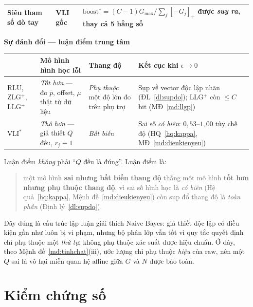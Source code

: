 \documentclass[11pt]{article}
\theoremstyle{remark}
\newcommand{\pos}[1]{\left[#1\right]_+}
\begin{document}
\begin{landscape}
\begin{tabular}{@{}p{4.6cm} p{3.6cm} p{12.4cm}@{}}
Siêu tham số dò tay & VLI gốc &
$\mathrm{boost}^\star=(C-1)G_{\max}/\sum_j\pos{-G_j}$ được \emph{suy ra}, thay cả 5 hằng số \\
\bottomrule
\end{tabular}

\vspace{1.4em}
\noindent\normalsize\textbf{Sự đánh đổi --- luận điểm trung tâm}

\vspace{0.5em}
\footnotesize
\noindent
\begin{tabular}{@{}l p{6.0cm} p{3.8cm} p{7.8cm}@{}}
\toprule
 & \textbf{Mô hình hình học lỗi} & \textbf{Thang độ} & \textbf{Kết cục khi $\bar\epsilon\to0$} \\
\midrule
RLU, ZLG$^+$, LLG$^+$ &
\emph{Tốt hơn} --- đo $\bar p$, offset, $\mu$ thật từ dữ liệu &
\emph{Phụ thuộc} một độ lớn đo trên phụ trợ &
Sụp về vector độc lập nhãn (ĐL~\ref{dl:supdo}); LLG$^+$ còn $\le C$ bit (MĐ~\ref{md:llgp}) \\
VLI$^*$ &
\emph{Thô hơn} --- giả thiết $Q$ đều, $r_j\equiv1$ &
\emph{Bất biến} &
Sai số \emph{có biên}: $0{,}53$--$1{,}00$ tùy chế độ (HQ~\ref{hq:kappa}, MĐ~\ref{md:dieukienyeu}) \\
\bottomrule
\end{tabular}
\end{landscape}

\noindent
Luận điểm \emph{không} phải ``$Q$ đều là đúng''. Luận điểm là:
\begin{quote}
một mô hình \textbf{sai nhưng bất biến thang độ} thắng một mô hình
\textbf{tốt hơn nhưng phụ thuộc thang độ}, vì sai số hình học là
\emph{có biên} (Hệ quả~\ref{hq:kappa}, Mệnh đề~\ref{md:dieukienyeu}) còn sụp
đổ thang độ là \emph{toàn phần} (Định lý~\ref{dl:supdo}).
\end{quote}
Đây đúng là cấu trúc lập luận giải thích Naive Bayes: giả thiết độc lập có
điều kiện gần như luôn bị vi phạm, nhưng bộ phân lớp vẫn tốt vì quy tắc quyết
định chỉ phụ thuộc một \emph{thứ tự}, không phụ thuộc xác suất được hiệu
chuẩn. Ở đây, theo Mệnh đề~\ref{md:tinhchat}(iii), ước lượng chỉ phụ thuộc
\emph{hiệu} của $\mathrm{raw}$, nên một $Q$ sai là vô hại miễn quan hệ affine
giữa $G$ và $N$ được bảo toàn.

\section{Kiểm chứng số}
\label{sec:kiemchung}
\end{document}
